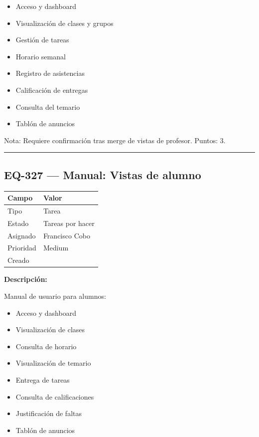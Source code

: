 \documentclass[
  spanish,
  11pt,
]{report}
\newcounter{none} %
\providecommand{\tightlist}{%
  \setlength{\itemsep}{0pt}\setlength{\parskip}{0pt}}
\begin{document}
\begin{itemize}
\tightlist
\item
  Acceso y dashboard
\item
  Visualización de clases y grupos
\item
  Gestión de tareas
\item
  Horario semanal
\item
  Registro de asistencias
\item
  Calificación de entregas
\item
  Consulta del temario
\item
  Tablón de anuncios
\end{itemize}

Nota: Requiere confirmación tras merge de vistas de profesor. Puntos: 3.

\begin{center}\rule{0.5\linewidth}{0.5pt}\end{center}

\subsection{EQ-327 --- Manual: Vistas de
alumno}\label{eq-327-manual-vistas-de-alumno}

{\def\LTcaptype{none} %
\begin{longtable}[]{@{}ll@{}}
\toprule\noalign{}
Campo & Valor \\
\midrule\noalign{}
\endhead
\bottomrule\noalign{}
\endlastfoot
Tipo & Tarea \\
Estado & Tareas por hacer \\
Asignado & Francisco Cobo \\
Prioridad & Medium \\
Creado & \\
\end{longtable}
}

\textbf{Descripción:}

Manual de usuario para alumnos:

\begin{itemize}
\tightlist
\item
  Acceso y dashboard
\item
  Visualización de clases
\item
  Consulta de horario
\item
  Visualización de temario
\item
  Entrega de tareas
\item
  Consulta de calificaciones
\item
  Justificación de faltas
\item
  Tablón de anuncios
\end{itemize}
\end{document}
